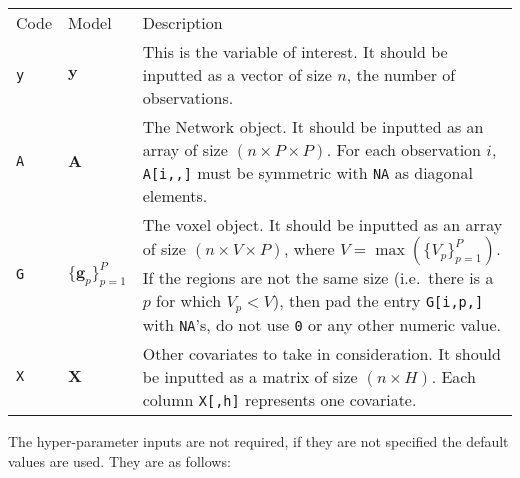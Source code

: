 \documentclass[
]{article}
\begin{document}
\begin{longtable}[]{@{}
  >{\raggedleft\arraybackslash}p{}
  >{\centering\arraybackslash}p{}
  >{\raggedright\arraybackslash}p{}@{}}
\toprule\noalign{}
\endhead
\bottomrule\noalign{}
\endlastfoot
Code & Model & Description \\
\texttt{y} & \( {\boldsymbol y} \) & This is the variable of interest. It should be inputted as a
vector of size \(n\), the number of observations. \\
\texttt{A} & \( {\boldsymbol A} \) & The Network object. It should be inputted as an array of
size \((n \times P \times P)\). For each observation \(i\),
\texttt{A{[}i,,{]}} must be symmetric with \texttt{NA} as diagonal elements. \\
\texttt{G} & \(\{ {\boldsymbol g} _p\}_{p=1}^P\) & The voxel object. It should be inputted as an array
of size \((n \times V \times P)\), where \(V= \max(\{V_p\}_{p=1}^P)\).
If the regions are not the same size (i.e.~there is a \(p\) for
which \(V_p < V\)), then pad the entry \texttt{G{[}i,p,{]}} with \texttt{NA}'s, do not
use \texttt{0} or any other numeric value. \\
\texttt{X} & \( {\boldsymbol X} \) & Other covariates to take in consideration. It should be inputted as
a matrix of size \((n \times H)\). Each column \texttt{X{[},h{]}} represents one
covariate. \\
\end{longtable}

The hyper-parameter inputs are not required, if they are not specified the
default values are used. They are as follows:
\end{document}
